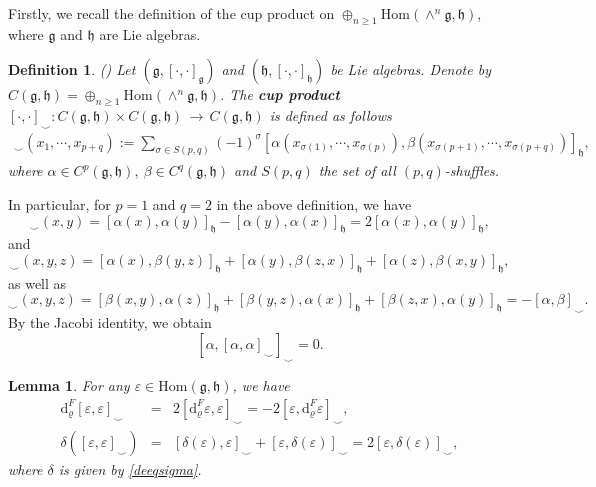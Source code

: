 \documentclass[12pt]{amsart}
\newtheorem{lem}[thm]{Lemma}
\newtheorem{defi}[thm]{Definition}
\newcommand{\lon }{\,\rightarrow\,}
\newcommand{\g}{\mathfrak g}
\newcommand{\h}{\mathfrak h}
\newcommand{\dM}{\mathrm{d}}
\newcommand{\Hom}{\mathrm{Hom}}
\begin{document}
Firstly, we recall the definition of the cup product on $\oplus_{n\geq 1}\Hom(\wedge^n\g,\h)$, where $\g$ and $\h$ are Lie algebras.
\begin{defi}{\rm (\cite{NR1})}
    Let $(\g, [\cdot, \cdot]_\g)$ and $(\h, [\cdot, \cdot]_\h)$ be Lie algebras. Denote by $C(\g,\h)=\oplus_{n\geq 1}\Hom(\wedge^n\g,\h)$. The {\bf cup product} $[\cdot,\cdot]_{\smile}:C(\g, \h)\times C(\g, \h)\lon C(\g, \h)$ is defined as follows
    \begin{eqnarray}
        [\alpha,\beta]_{\smile}(x_{1},\cdots,x_{p+q}):=\sum_{\sigma\in S(p,q)} (-1)^\sigma[\alpha(x_{\sigma(1)},\cdots,x_{\sigma(p)}),\beta(x_{\sigma(p+1)},\cdots,x_{\sigma(p+q)})]_{\h},
    \end{eqnarray}
    where $\alpha\in C^p(\g,\h),\ \beta\in C^q(\g,\h)$ and $S(p,q)$ the set of all $(p,q)$-shuffles.
\end{defi}
In particular, for $p=1$ and $q=2$ in the above definition, we have 
\begin{equation*}
    [\alpha,\alpha]_{\smile}(x,y)=[\alpha(x),\alpha(y)]_{\h}-[\alpha(y),\alpha(x)]_{\h}=2[\alpha(x),\alpha(y)]_{\h},
\end{equation*}
and
\begin{equation*}
    [\alpha,\beta]_{\smile}(x,y,z)=[\alpha(x),\beta(y,z)]_{\h}+[\alpha(y),\beta(z,x)]_{\h}+[\alpha(z),\beta(x,y)]_{\h},
\end{equation*}
as well as
\begin{equation*}
    [\beta,\alpha]_{\smile}(x,y,z)=[\beta(x,y),\alpha(z)]_{\h}+[\beta(y,z),\alpha(x)]_{\h}+[\beta(z,x),\alpha(y)]_{\h}=-[\alpha,\beta]_{\smile}.
\end{equation*}
By the {\rm Jacobi} identity, we obtain
\begin{equation}\label{rrr0}
[\alpha,[\alpha,\alpha]_{\smile}]_{\smile}=0.
\end{equation}
\begin{lem}
    For any $\varepsilon \in \Hom(\g,\h)$, we have 
    \begin{eqnarray}\label{dsmile}
        \dM^F_{\varrho}[\varepsilon,\varepsilon]_{\smile}&=&2[\dM^F_{\varrho}\varepsilon,\varepsilon]_{\smile}=-2[\varepsilon,\dM^F_{\varrho}\varepsilon]_{\smile},\\
    \label{deltasmile}
        \delta([\varepsilon,\varepsilon]_{\smile})&=&[\delta(\varepsilon),\varepsilon]_{\smile}+[\varepsilon,\delta(\varepsilon)]_{\smile}=2[\varepsilon,\delta(\varepsilon)]_{\smile},
    \end{eqnarray}
    where $\delta$ is given by \eqref{deeqsigma}.
    \end{lem}
\end{document}
